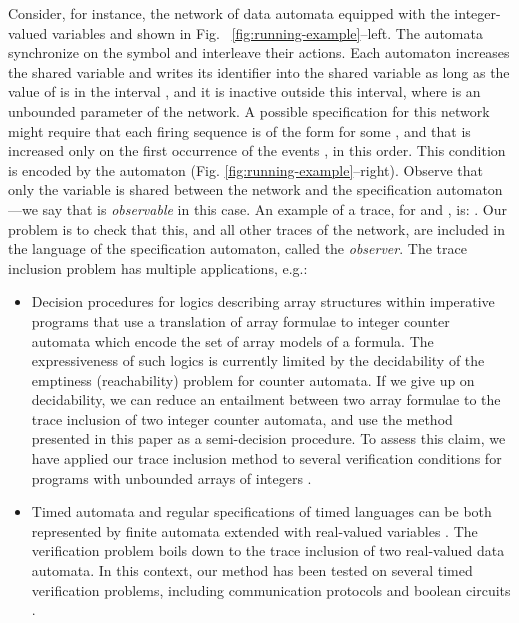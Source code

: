 \documentclass{llncs}
\begin{document}
Consider, for instance, the network  of data
automata equipped with the integer-valued variables  and  shown
in Fig.~ \ref{fig:running-example}--left. The automata synchronize on
the  symbol and interleave their
 actions.  Each automaton  increases the
shared variable  and writes its identifier  into the shared
variable  as long as the value of  is in the interval
, and it is inactive outside this interval,
where  is an unbounded parameter of the network. A
possible specification for this network might require that each firing
sequence is of the form  for some , and that  is increased
only on the first occurrence of the events
, in this order. This condition is
encoded by the automaton 
(Fig. \ref{fig:running-example}--right). Observe that only the 
variable is shared between the network  and
the specification automaton ---we say that  is \emph{observable}
in this case.  An example of a trace, for  and , is:
. Our problem is to check that this, and all other traces of
the network, are included in the language of the specification
automaton, called the \emph{observer}. The trace inclusion problem
has multiple applications,
e.g.:\begin{itemize}\setlength{\itemsep}{1mm}

    \item Decision procedures for logics describing array structures
      within imperative programs \cite{lia,lpar08} that use a
      translation of array formulae to integer counter automata which
      encode the set of array models of a formula. The expressiveness
      of such logics is currently limited by the decidability of the
      emptiness (reachability) problem for counter automata. If we
      give up on decidability, we can reduce an entailment between two
      array formulae to the trace inclusion of two integer counter
      automata, and use the method presented in this paper as a
      semi-decision procedure. To assess this claim, we have applied
      our trace inclusion method to several verification conditions
      for programs with unbounded arrays of integers \cite{cav09}.

    \item Timed automata and regular specifications of timed languages
      \cite{AlurDill94} can be both represented by finite automata
      extended with real-valued variables
      \cite{fribourg:timedAutomata}. The verification problem boils
      down to the trace inclusion of two real-valued data automata.
      In this context, our method has been tested on several timed
      verification problems, including communication protocols and
      boolean circuits \cite{stavros-thesis}.
\end{itemize} 
\end{document}
